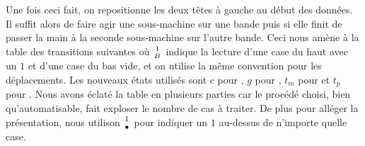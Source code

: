 \begin{multicols}{2}


\phantom{\emptybox\emptybox}%
	\deah

\emptybox\emptybox%
\emptybox\emptybox

\emptybox\emptybox%
	\emptybox\emptybox\emptybox%
\emptybox\emptybox

\phantom{\emptybox\emptybox}%
	\head


\medskip %

\phantom{\emptybox\emptybox\emptybox}%
	\deah

\emptybox\emptybox%
\emptybox\emptybox

\emptybox\emptybox%
	\emptybox\emptybox%
\emptybox\emptybox

\phantom{\emptybox\emptybox\emptybox}%
	\head


\medskip %

\phantom{\emptybox\emptybox\emptybox\emptybox}%
	\deah

\emptybox\emptybox%
\emptybox\emptybox

\emptybox\emptybox%
	\emptybox%
\emptybox\emptybox

\phantom{\emptybox\emptybox\emptybox\emptybox}%
	\head


\medskip %

\phantom{\emptybox\emptybox\emptybox\emptybox\emptybox}%
	\deah

\emptybox\emptybox%
\emptybox\emptybox

\emptybox\emptybox%
\emptybox\emptybox

\phantom{\emptybox\emptybox\emptybox\emptybox\emptybox}%
	\head

\end{multicols}


Une fois ceci fait, on repositionne les deux têtes à gauche au début des données.
Il suffit alors de faire agir une sous-machine sur une bande puis si elle finit de passer la main à la seconde sous-machine sur l'autre bande.
Ceci nous amène à la table des transitions suivantes où $\twocoord{1}{B}$ indique la lecture d'une case du haut avec un $1$ et d'une case du bas vide, et on utilise la même convention pour les déplacements.
Les nouveaux états utilisés sont
$c$ pour , 
$g$ pour ,
$t_m$ pour  et
$t_p$ pour .
Nous avons éclaté la table en plusieurs parties car le procédé choisi, bien qu'automatisable, fait exploser le nombre de cas à traiter.
De plus pour alléger la présentation, nous utilison $\twocoord{1}{\bullet}$ pour indiquer un $1$ au-dessus de n'importe quelle case.

